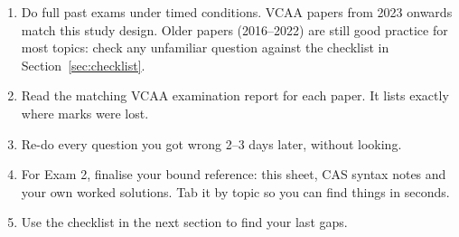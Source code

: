 \begin{tip}
\begin{enumerate}
  \item Do full past exams under timed conditions. VCAA papers from 2023 onwards match this study design. Older papers (2016--2022) are still good practice for most topics: check any unfamiliar question against the checklist in Section~\ref{sec:checklist}.
  \item Read the matching VCAA examination report for each paper. It lists exactly where marks were lost.
  \item Re-do every question you got wrong 2--3 days later, without looking.
  \item For Exam 2, finalise your bound reference: this sheet, CAS syntax notes and your own worked solutions. Tab it by topic so you can find things in seconds.
  \item Use the checklist in the next section to find your last gaps.
\end{enumerate}
\end{tip}

